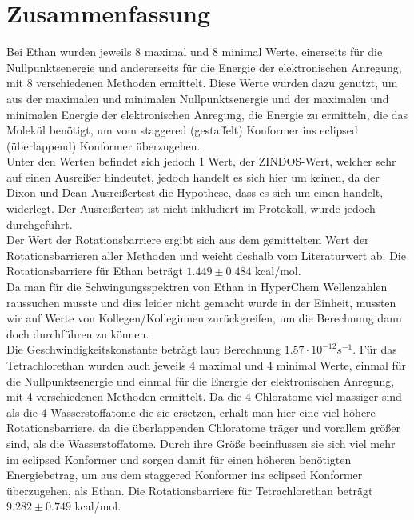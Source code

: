 \newpage
\section{Zusammenfassung}

Bei Ethan wurden jeweils 8 maximal und 8 minimal Werte, einerseits für die Nullpunktsenergie und andererseits für die Energie der elektronischen
Anregung, mit 8 verschiedenen Methoden ermittelt. Diese Werte wurden dazu genutzt, um aus der maximalen und minimalen Nullpunktsenergie und der 
maximalen und minimalen Energie der elektronischen Anregung, die Energie zu ermitteln, die das Molekül benötigt, um vom staggered (gestaffelt) 
Konformer ins eclipsed (überlappend) Konformer überzugehen. \\
Unter den Werten befindet sich jedoch 1 Wert, der ZINDOS-Wert, welcher sehr auf einen Ausreißer hindeutet, jedoch handelt es sich hier um keinen, 
da der Dixon und Dean Ausreißertest die Hypothese, dass es sich um einen handelt, widerlegt. Der Ausreißertest ist nicht inkludiert im Protokoll, 
wurde jedoch durchgeführt. \\
Der Wert der Rotationsbarriere ergibt sich aus dem gemitteltem Wert der Rotationsbarrieren aller Methoden und weicht deshalb vom Literaturwert ab.
Die Rotationsbarriere für Ethan beträgt $1.449 \pm 0.484$ kcal/mol.\\
Da man für die Schwingungsspektren von Ethan in HyperChem Wellenzahlen raussuchen musste und dies leider nicht gemacht wurde in der Einheit,
mussten wir auf Werte von Kollegen/Kolleginnen zurückgreifen, um die Berechnung dann doch durchführen zu können. \\
Die Geschwindigkeitskonstante beträgt laut Berechnung $1.57 \cdot 10^{-12} s^{-1}$.
Für das Tetrachlorethan wurden auch jeweils 4 maximal und 4 minimal Werte, einmal für die Nullpunktsenergie und einmal für die Energie der elektronischen Anregung, mit 4 verschiedenen Methoden ermittelt. Da die 4 Chloratome viel massiger sind als die 4 Wasserstoffatome die sie ersetzen, erhält man hier eine viel höhere Rotationsbarriere, da die überlappenden Chloratome träger und vorallem größer sind, als die Wasserstoffatome. Durch ihre Größe beeinflussen sie sich viel mehr im eclipsed Konformer und sorgen damit für einen höheren benötigten Energiebetrag, um aus dem staggered Konformer ins eclipsed Konformer überzugehen, als Ethan.
Die Rotationsbarriere für Tetrachlorethan beträgt $9.282 \pm 0.749$ kcal/mol.


